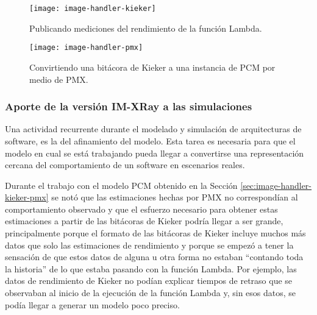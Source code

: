 


\begin{figure}[h]
  \centering
  \texttt{[image: image-handler-kieker]}
  \caption{Publicando mediciones del rendimiento de la función Lambda.}
  \label{fig:image-handler-kieker}
\end{figure}

\begin{figure}[h]
  \centering
  \texttt{[image: image-handler-pmx]}
  \caption{Convirtiendo una bitácora de Kieker a una instancia de PCM por medio de PMX.}
  \label{fig:image-handler-pmx}
\end{figure}

\subsubsection{Aporte de la versión IM-XRay a las simulaciones}\label{sec:image-handler-xray}
Una actividad recurrente durante el modelado y simulación de arquitecturas de software, es la del afinamiento del modelo. Esta tarea es necesaria para que el modelo en cual se está trabajando pueda llegar a convertirse una representación cercana del comportamiento de un software en escenarios reales. 

Durante el trabajo con el modelo PCM obtenido en la Sección \ref{sec:image-handler-kieker-pmx} se notó que las estimaciones hechas por PMX no correspondían al comportamiento observado y que el esfuerzo necesario para obtener estas estimaciones a partir de las bitácoras de Kieker podría llegar a ser grande, principalmente porque el formato de las bitácoras de Kieker incluye muchos más datos que solo las estimaciones de rendimiento y porque se empezó a tener la sensación de que estos datos de alguna u otra forma no estaban ``contando toda la historia'' de lo que estaba pasando con la función Lambda. Por ejemplo, las datos de rendimiento de Kieker no podían explicar tiempos de retraso que se observaban al inicio de la ejecución de la función Lambda y, sin esos datos, se podía llegar a generar un modelo poco preciso.

